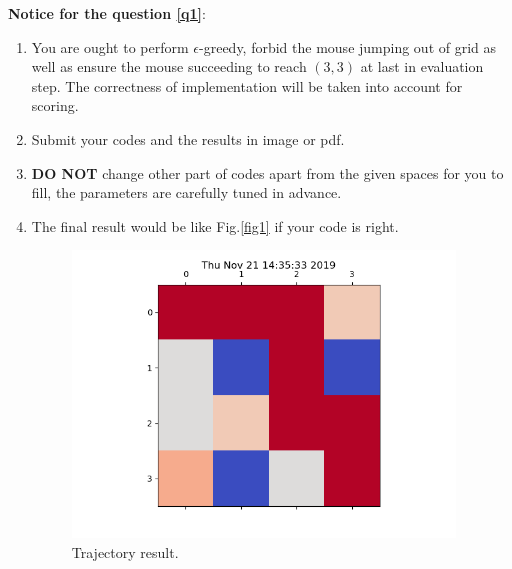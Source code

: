 \documentclass[a4paper, 12pt, answers]{exam}
\begin{document}
\begin{flushleft}
\textbf{Notice for the question \ref{q1}}: \\
\begin{enumerate}
\item You are ought to perform $\epsilon$-greedy, forbid the mouse jumping out of grid as well as ensure the mouse succeeding to reach $(3,3)$ at last in evaluation step. The correctness of implementation will be taken into account for scoring.
\item Submit your codes and the results in image or pdf.
\item \textbf{DO NOT} change other part of codes apart from the given spaces for you to fill, the parameters are carefully tuned in advance.
\item The final result would be like Fig.\ref{fig1} if your code is right.




\begin{figure}[htbp]
\centering
\includegraphics[width=4in]{1.png}
\caption{Trajectory result.}\label{fig2}
\end{figure}

\end{enumerate}
\end{flushleft}




\end{document}
